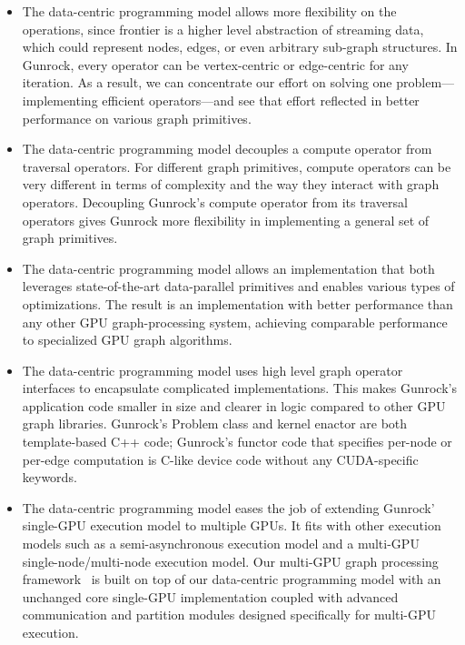 \documentclass[format=acmsmall,review=false,screen=true]{acmart}
\begin{document}
\begin{itemize}
\item The data-centric programming model allows more flexibility on
  the operations, since frontier is a higher level abstraction of
  streaming data, which could represent nodes, edges, or even
  arbitrary sub-graph structures. In Gunrock, every operator can be
  vertex-centric or edge-centric for any iteration. As a result, we
  can concentrate our effort on solving one problem---implementing
  efficient operators---and see that effort reflected in better
  performance on various graph primitives.

\item The data-centric programming model decouples a compute operator
  from traversal operators. For different graph primitives, compute
  operators can be very different in terms of complexity and the way
  they interact with graph operators. Decoupling Gunrock's compute
  operator from its traversal operators gives Gunrock more flexibility
  in implementing a general set of graph primitives.

\item The data-centric programming model allows an implementation that
  both leverages state-of-the-art data-parallel primitives and enables
  various types of optimizations. The result is an implementation with
  better performance than any other GPU graph-processing system,
  achieving comparable performance to specialized GPU graph
  algorithms.

\item The data-centric programming model uses high level graph
  operator interfaces to encapsulate complicated implementations. This
  makes Gunrock's application code smaller in size and clearer in
  logic compared to other GPU graph libraries. Gunrock's Problem class
  and kernel enactor are both template-based C++ code; Gunrock's
  functor code that specifies per-node or per-edge computation is
  C-like device code without any CUDA-specific keywords.

\item The data-centric programming model eases the job of extending
  Gunrock' single-GPU execution model to multiple GPUs. It fits with
  other execution models such as a semi-asynchronous execution model
  and a multi-GPU single-node/multi-node execution model. Our
  multi-GPU graph processing framework~\cite{Pan:2016:MGA} is built on
  top of our data-centric programming model with an unchanged core
  single-GPU implementation coupled with advanced communication and
  partition modules designed specifically for multi-GPU execution.
\end{itemize}
\end{document}
